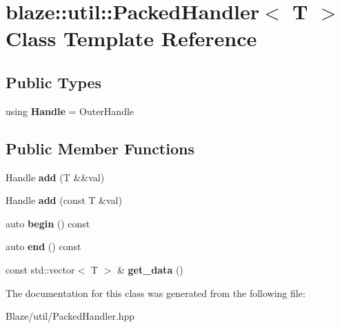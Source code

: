 \hypertarget{classblaze_1_1util_1_1PackedHandler}{}\section{blaze\+:\+:util\+:\+:Packed\+Handler$<$ T $>$ Class Template Reference}
\label{classblaze_1_1util_1_1PackedHandler}
\subsection*{Public Types}
\begin{DoxyCompactItemize}
\item 
\mbox{\label{classblaze_1_1util_1_1PackedHandler_aa14ddb733eb2fb3fceeb8c2a7899ab18}} 
using {\bfseries Handle} = Outer\+Handle
\end{DoxyCompactItemize}
\subsection*{Public Member Functions}
\begin{DoxyCompactItemize}
\item 
\mbox{\label{classblaze_1_1util_1_1PackedHandler_a6bdbedd66950ab4693b1558d3a159ca6}} 
Handle {\bfseries add} (T \&\&val)
\item 
\mbox{\label{classblaze_1_1util_1_1PackedHandler_a071593822b585108135246147ba5e09b}} 
Handle {\bfseries add} (const T \&val)
\item 
\mbox{\label{classblaze_1_1util_1_1PackedHandler_a33b1e035cc41c8d9c7be6a0dd2d0b5be}} 
auto {\bfseries begin} () const
\item 
\mbox{\label{classblaze_1_1util_1_1PackedHandler_a903887e5159c7543cc0aa65fc8a171a5}} 
auto {\bfseries end} () const
\item 
\mbox{\label{classblaze_1_1util_1_1PackedHandler_a0b20397d35d371fa980698eda777be93}} 
const std\+::vector$<$ T $>$ \& {\bfseries get\+\_\+data} ()
\end{DoxyCompactItemize}


The documentation for this class was generated from the following file\+:\begin{DoxyCompactItemize}
\item 
Blaze/util/Packed\+Handler.\+hpp\end{DoxyCompactItemize}
